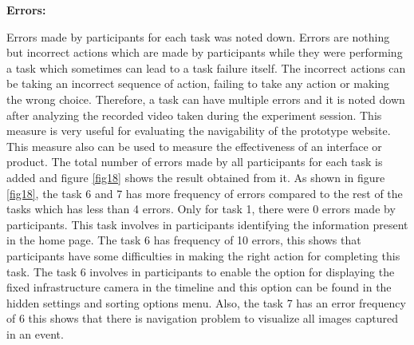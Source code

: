 \documentclass[mscthesis]{usiinfthesis}
\begin{document}
\begin{table}[!ht]
\centering
{}
\caption{List of tasks performed by participants.}
\label{tab4}
\end{table}

\textbf{Errors:}

Errors made by participants for each task was noted down. Errors are nothing but incorrect actions which are made by participants while they were performing a task which sometimes can lead to a task failure itself. The incorrect actions can be taking an incorrect sequence of action, failing to take any action or making the wrong choice. Therefore, a task can have multiple errors and it is noted down after analyzing the recorded video taken during the experiment session. This measure is very useful for evaluating the navigability of the prototype website. This measure also can be used to measure the effectiveness of an interface or product. The total number of errors made by all participants for each task is added and figure \ref{fig18} shows the result obtained from it. As shown in figure \ref{fig18}, the task 6 and 7 has more frequency of errors compared to the rest of the tasks which has less than 4 errors. Only for task 1, there were 0 errors made by participants. This task involves in participants identifying the information present in the home page. The task 6 has frequency of 10 errors, this shows that participants have some difficulties in making the right action for completing this task. The task 6 involves in participants to enable the option for displaying the fixed infrastructure camera in the timeline and this option can be found in the hidden settings and sorting options menu. Also, the task 7 has an error frequency of 6 this shows that there is navigation problem to visualize all images captured in an event.
\end{document}
